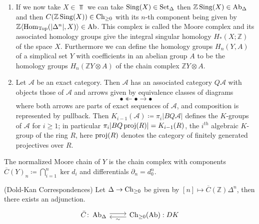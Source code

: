 \begin{rmk}
    \begin{enumerate}
        \item 
        If we now take $ X \in \Top $ we can take $ \operatorname{Sing} ( X ) \in \operatorname{Set}_{\Delta} $ then $ \mathbb{ Z } \operatorname{Sing} ( X ) \in \operatorname{Ab}_{\Delta} $ and then $ C ( \mathbb{ Z } \operatorname{Sing} ( X ) ) \in \operatorname{Ch}_{\geq 0}$ with its $n$-th component being given by $ \mathbb{ Z } \langle \operatorname{Hom}_{ \operatorname{Top} } ( \lvert \Delta^n \rvert , X ) \rangle \in \operatorname{Ab} $.
        This complex is called the Moore complex and its associated homology groups give the integral singular homology $ H_* ( X ; \mathbb{ Z } ) $ of the space $ X $.
        Furthermore we can define the homology groups $ H_n( Y , A )$ of a simplical set $ Y $ with coefficients in an abelian group $ A $ to be the homology groups $ H_n ( \mathbb{ Z } Y \otimes A )$ of the chain complex $ \mathbb{ Z } Y \otimes A $.

        \item 
        Let $ \mathcal{ A } $ be an exact category. 
        Then $\mathcal{ A } $ has an associated category $ Q \mathcal{ A } $ with objects those of $ \mathcal{ A } $ and arrows given by equivalence classes of diagrams 
        \[
            \bullet \twoheadleftarrow \bullet \rightarrow \bullet
        \]
        where both arrows are parts of exact sequences of $ \mathcal{ A } $, and composition is represented by pullback. 
        Then $ K_{i-1} ( \mathcal{ A } ) \coloneqq \pi_i \lvert BQ\mathcal A \rvert $ defines the $ K $-groups of $ \mathcal{ A } $ for $  i \geq 1 $; in particular $ \pi_i \lvert B Q \operatorname{proj} ( R ) \rvert = K_{i-1} ( R )$, the $ i^{th}$ algebraic $K$-group of the ring $ R $, here $ \operatorname{proj} ( R ) $ denotes the category of finitely generated projectives over $ R $.
    \end{enumerate}
\end{rmk}

\begin{defi}
    The normalized Moore chain of $ Y $ is the chain complex with components $ \overline{C} ( Y )_n \coloneqq \bigcap_{ i = 1 }^n \ker d_i $ and differentials $ \partial_n = d^n_0 $.
\end{defi}

\begin{thm}(Dold-Kan Correspondences)
    Let $ \Delta \to \operatorname{Ch}_{ \geq 0 } $ be given by $ [n ] \mapsto \overline{C} ( \mathbb{ Z } ) \Delta^n $, then there exists an adjunction.
    \[
    \begin{tikzcd}
        \Bar{C}\colon \Ab_{\Delta}
        \ar[r, shift left]
        &
        \Ch_{ \geq 0 }( \Ab ) : DK 
        \ar[l , shift left, "\sim"]
    \end{tikzcd}
    \]
\end{thm}

